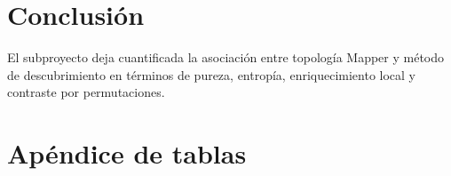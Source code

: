 \documentclass[11pt]{article}
\begin{document}
\section{Conclusi\'on}
El subproyecto deja cuantificada la asociaci\'on entre topolog\'ia Mapper y m\'etodo de descubrimiento en t\'erminos de pureza, entrop\'ia, enriquecimiento local y contraste por permutaciones.

\appendix
\section{Ap\'endice de tablas}



\end{document}

